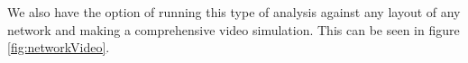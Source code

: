 






    
We also have the option of running this type of analysis against any layout of any network and making a comprehensive video simulation. This can be seen in figure \ref{fig:networkVideo}.

